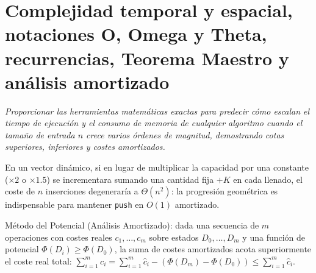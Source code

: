 \documentclass{book}
\begin{document}
\chapter{Complejidad temporal y espacial, notaciones O, Omega y Theta, recurrencias, Teorema Maestro y análisis amortizado}
\label{chap:cap01-complejidad-asintotica-recurrencias-amortizado}

\noindent\textit{Proporcionar las herramientas matemáticas exactas para predecir cómo escalan el tiempo de ejecución y el consumo de memoria de cualquier algoritmo cuando el tamaño de entrada \(n\) crece varios órdenes de magnitud, demostrando cotas superiores, inferiores y costes amortizados.}

\begin{tcolorbox}[title={Consejo}, studiumtip, breakable]

En un vector dinámico, si en lugar de multiplicar la capacidad por una constante (\(\times 2\) o \(\times 1.5\)) se incrementara sumando una cantidad fija \(+K\) en cada llenado, el coste de \(n\) inserciones degeneraría a \(\Theta(n^2)\): la progresión geométrica es indispensable para mantener \texttt{push} en \(O(1)\) amortizado.
\end{tcolorbox}

\begin{tcolorbox}[title={Definición}, studiumdef, breakable]

Método del Potencial (Análisis Amortizado): dada una secuencia de \(m\) operaciones con costes reales \(c_1, \dots, c_m\) sobre estados \(D_0, \dots, D_m\) y una función de potencial \(\Phi(D_i) \ge \Phi(D_0)\), la suma de costes amortizados acota superiormente el coste real total: \(\sum_{i=1}^m c_i = \sum_{i=1}^m \hat{c}_i - (\Phi(D_m) - \Phi(D_0)) \le \sum_{i=1}^m \hat{c}_i\).
\end{tcolorbox}
\end{document}
